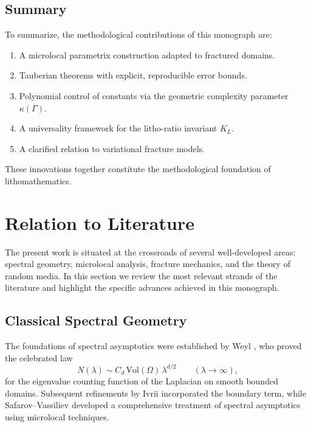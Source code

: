 \subsection{Summary}

To summarize, the methodological contributions of this monograph are:

\begin{enumerate}
  \item A microlocal parametrix construction adapted to fractured domains.
  \item Tauberian theorems with explicit, reproducible error bounds.
  \item Polynomial control of constants via the geometric complexity parameter
  $\kappa(\Gamma)$.
  \item A universality framework for the litho-ratio invariant $K_L$.
  \item A clarified relation to variational fracture models.
\end{enumerate}

These innovations together constitute the methodological foundation of
lithomathematics.


\section{Relation to Literature}

The present work is situated at the crossroads of several well-developed areas:
spectral geometry, microlocal analysis, fracture mechanics, and the theory of
random media. In this section we review the most relevant strands of the
literature and highlight the specific advances achieved in this monograph.

\subsection{Classical Spectral Geometry}

The foundations of spectral asymptotics were established by Weyl
\cite{Weyl1911}, who proved the celebrated law
\[
    N(\lambda) \sim C_d \, \mathrm{Vol}(\Omega) \, \lambda^{d/2}
    \qquad (\lambda \to \infty),
\]
for the eigenvalue counting function of the Laplacian on smooth bounded
domains. Subsequent refinements by Ivrii \cite{Ivrii1980} incorporated the
boundary term, while Safarov--Vassiliev \cite{SafarovVassiliev1997} developed a
comprehensive treatment of spectral asymptotics using microlocal techniques.

